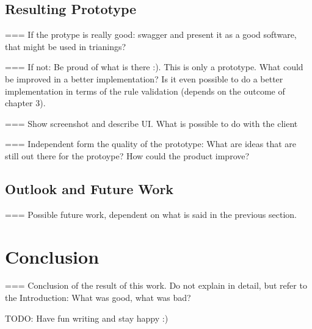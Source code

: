 \section{Resulting Prototype}
=== If the protype is really good: swagger and present it as a good software, that might be used in trianings?

=== If not: Be proud of what is there :). This is only a prototype. What could be improved in a better implementation? Is it even possible to do a better implementation in terms of the rule validation (depends on the outcome of chapter 3).

=== Show screenshot and describe UI. What is possible to do with the client

=== Independent form the quality of the prototype: What are ideas that are still out there for the protoype? 
How could the product improve?
\section{Outlook and Future Work}
=== Possible future work, dependent on what is said in the previous section.


\chapter{Conclusion}
=== Conclusion of the result of this work. Do not explain in detail, but refer to the Introduction: What was good, what was bad?


TODO: Have fun writing and stay happy :)



